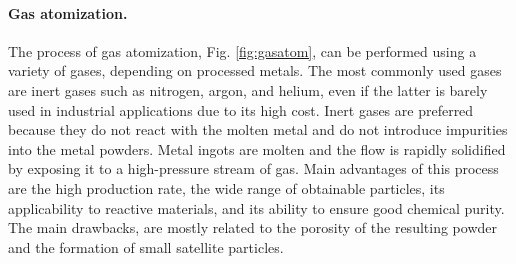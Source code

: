 \paragraph{Gas atomization.} The process of gas atomization, Fig. \ref{fig:gasatom}, can be performed using a variety of gases, depending on processed metals. The most commonly used gases are inert gases such as nitrogen, argon, and helium, even if the latter is barely used in industrial applications due to its high cost. Inert gases are preferred because they do not react with the molten metal and do not introduce impurities into the metal powders. Metal ingots are molten and the flow is rapidly solidified by exposing it to a high-pressure stream of gas. Main advantages of this process are the high production rate, the wide range of obtainable particles, its applicability to reactive materials, and its ability to ensure good chemical purity. The main drawbacks, are mostly related to the porosity of the resulting powder and the formation of small satellite particles.
